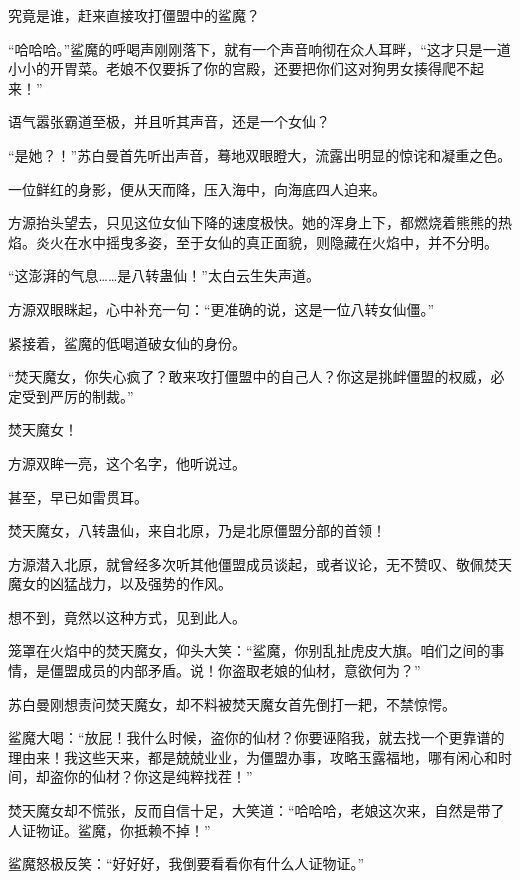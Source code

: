\begin{this_body}
究竟是谁，赶来直接攻打僵盟中的鲨魔？

“哈哈哈。”鲨魔的呼喝声刚刚落下，就有一个声音响彻在众人耳畔，“这才只是一道小小的开胃菜。老娘不仅要拆了你的宫殿，还要把你们这对狗男女揍得爬不起来！”

语气嚣张霸道至极，并且听其声音，还是一个女仙？

“是她？！”苏白曼首先听出声音，蓦地双眼瞪大，流露出明显的惊诧和凝重之色。

一位鲜红的身影，便从天而降，压入海中，向海底四人迫来。

方源抬头望去，只见这位女仙下降的速度极快。她的浑身上下，都燃烧着熊熊的热焰。炎火在水中摇曳多姿，至于女仙的真正面貌，则隐藏在火焰中，并不分明。

“这澎湃的气息……是八转蛊仙！”太白云生失声道。

方源双眼眯起，心中补充一句：“更准确的说，这是一位八转女仙僵。”

紧接着，鲨魔的低喝道破女仙的身份。

“焚天魔女，你失心疯了？敢来攻打僵盟中的自己人？你这是挑衅僵盟的权威，必定受到严厉的制裁。”

焚天魔女！

方源双眸一亮，这个名字，他听说过。

甚至，早已如雷贯耳。

焚天魔女，八转蛊仙，来自北原，乃是北原僵盟分部的首领！

方源潜入北原，就曾经多次听其他僵盟成员谈起，或者议论，无不赞叹、敬佩焚天魔女的凶猛战力，以及强势的作风。

想不到，竟然以这种方式，见到此人。

笼罩在火焰中的焚天魔女，仰头大笑：“鲨魔，你别乱扯虎皮大旗。咱们之间的事情，是僵盟成员的内部矛盾。说！你盗取老娘的仙材，意欲何为？”

苏白曼刚想责问焚天魔女，却不料被焚天魔女首先倒打一耙，不禁惊愕。

鲨魔大喝：“放屁！我什么时候，盗你的仙材？你要诬陷我，就去找一个更靠谱的理由来！我这些天来，都是兢兢业业，为僵盟办事，攻略玉露福地，哪有闲心和时间，却盗你的仙材？你这是纯粹找茬！”

焚天魔女却不慌张，反而自信十足，大笑道：“哈哈哈，老娘这次来，自然是带了人证物证。鲨魔，你抵赖不掉！”

鲨魔怒极反笑：“好好好，我倒要看看你有什么人证物证。”

\end{this_body}

